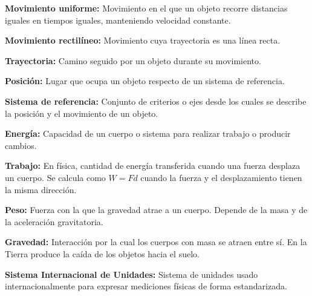 \documentclass[12pt,final]{report}
\theoremstyle{plain}
\theoremstyle{definition}
\begin{document}
\vspace{0.5em}

\textbf{Movimiento uniforme:} Movimiento en el que un objeto recorre distancias iguales en tiempos iguales, manteniendo velocidad constante.

\vspace{0.5em}

\textbf{Movimiento rectilíneo:} Movimiento cuya trayectoria es una línea recta.

\vspace{0.5em}

\textbf{Trayectoria:} Camino seguido por un objeto durante su movimiento.

\vspace{0.5em}

\textbf{Posición:} Lugar que ocupa un objeto respecto de un sistema de referencia.

\vspace{0.5em}

\textbf{Sistema de referencia:} Conjunto de criterios o ejes desde los cuales se describe la posición y el movimiento de un objeto.

\vspace{0.5em}

\textbf{Energía:} Capacidad de un cuerpo o sistema para realizar trabajo o producir cambios.

\vspace{0.5em}

\textbf{Trabajo:} En física, cantidad de energía transferida cuando una fuerza desplaza un cuerpo. Se calcula como $W=Fd$ cuando la fuerza y el desplazamiento tienen la misma dirección.

\vspace{0.5em}

\textbf{Peso:} Fuerza con la que la gravedad atrae a un cuerpo. Depende de la masa y de la aceleración gravitatoria.

\vspace{0.5em}

\textbf{Gravedad:} Interacción por la cual los cuerpos con masa se atraen entre sí. En la Tierra produce la caída de los objetos hacia el suelo.

\vspace{0.5em}

\textbf{Sistema Internacional de Unidades:} Sistema de unidades usado internacionalmente para expresar mediciones físicas de forma estandarizada.

\vspace{0.5em}
\end{document}
